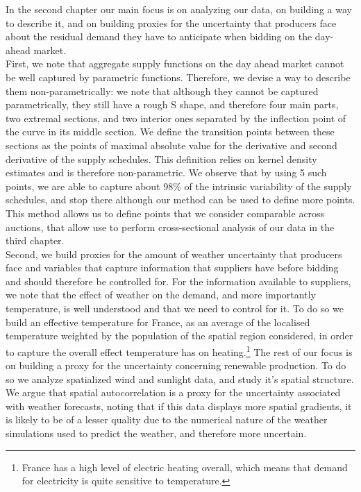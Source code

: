 In the second chapter our main focus is on analyzing our data, on building a way to describe it, and on building proxies for the uncertainty that producers face about the residual demand they have to anticipate when bidding on the day-ahead market. \\

First, we note that aggregate supply functions on the day ahead market cannot be well captured by parametric functions. Therefore, we devise a way to describe them non-parametrically: we note that although they cannot be captured parametrically, they still have a rough S shape, and therefore four main parts, two extremal sections, and two interior ones separated by the inflection point of the curve in its middle section. We define the transition points between these sections as the points of maximal absolute value for the derivative and second derivative of the supply schedules. This definition relies on kernel density estimates and is therefore non-parametric. We observe that by using 5 such points, we are able to capture about 98\% of the intrinsic variability of the supply schedules, and stop there although our method can be used to define more points. This method allows us to define points that we consider comparable across auctions, that allow use to perform cross-sectional analysis of our data in the third chapter. \\

Second, we build proxies for the amount of weather uncertainty that producers face and variables that capture information that suppliers have before bidding and should therefore be controlled for. For the information available to suppliers, we note that the effect of weather on the demand, and more importantly temperature, is well understood and that we need to control for it. To do so we build an effective temperature for France, as an average of the localised temperature weighted by the population of the spatial region considered, in order to capture the overall effect temperature has on heating.\footnote{France has a high level of electric heating overall, which means that demand for electricity is quite sensitive to temperature.} The rest of our focus is on building a proxy for the uncertainty concerning renewable production. To do so we analyze spatialized wind and sunlight data, and study it's spatial structure. We argue that spatial autocorrelation is a proxy for the uncertainty associated with weather forecasts, noting that if this data displays more spatial gradients, it is likely to be of a lesser quality due to the numerical nature of the weather simulations used to predict the weather, and therefore more uncertain.\\

